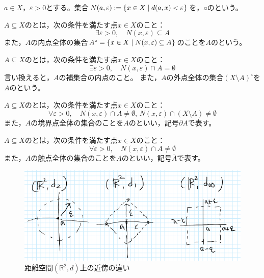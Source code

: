 \documentclass{jsarticle}
\begin{document}
\begin{teigi} %
     $a \in X$，$\varepsilon > 0$とする。集合$N(a,\varepsilon) := \Set{\hspace{-1.8pt} x \in X | d(a,x) < \varepsilon \hspace{-1.8pt}}$を，$a$のという。

     $A \subseteq X$のとは，次の条件を満たす点$x \in X$のこと：
    \begin{equation}
        \exists \varepsilon > 0, \quad N(x,\varepsilon) \subseteq A
    \end{equation}
    また，$A$の内点全体の集合$A^{\circ} = \Set{\hspace{-1.8pt} x \in X | N(x, \varepsilon) \subseteq A \hspace{-1.8pt}}$のことを$A$のという。

     $A \subseteq X$のとは，次の条件を満たす点$x \in X$のこと：
    \begin{equation}
        \exists \varepsilon > 0, \quad N(x , \varepsilon ) \cap A = \emptyset
    \end{equation}
    言い換えると，$A$の補集合の内点のこと。
    また，$A$の外点全体の集合$(X \setminus A)^{\circ}$を$A$のという。

     $A \subseteq X$のとは，次の条件を満たす点$x \in X$のこと：
    \begin{equation}
        \forall \varepsilon > 0, \quad N(x, \varepsilon) \cap A \neq \emptyset, \, N(x,\varepsilon) \cap (X \setminus A) \neq \emptyset
    \end{equation}
    また，$A$の境界点全体の集合のことを$A$のといい，記号$\partial A$で表す。

     $A \subseteq X$のとは，次の条件を満たす点$x \in X$のこと：
    \begin{equation}
        \forall \varepsilon > 0, \quad N (x,\varepsilon) \cap A \neq \emptyset
    \end{equation}
    また，$A$の触点全体の集合のことを$A$のといい，記号$\overline{A}$で表す。
\end{teigi}

\begin{figure}[htbp]
    \centering
    \includegraphics[clip,width=0.8\columnwidth]{euclid_dist.png}
    \caption{距離空間$(\mathbb{R}^{2},d)$上の近傍の違い}
    \label{fig:euclid_dist}
\end{figure}
\end{document}

